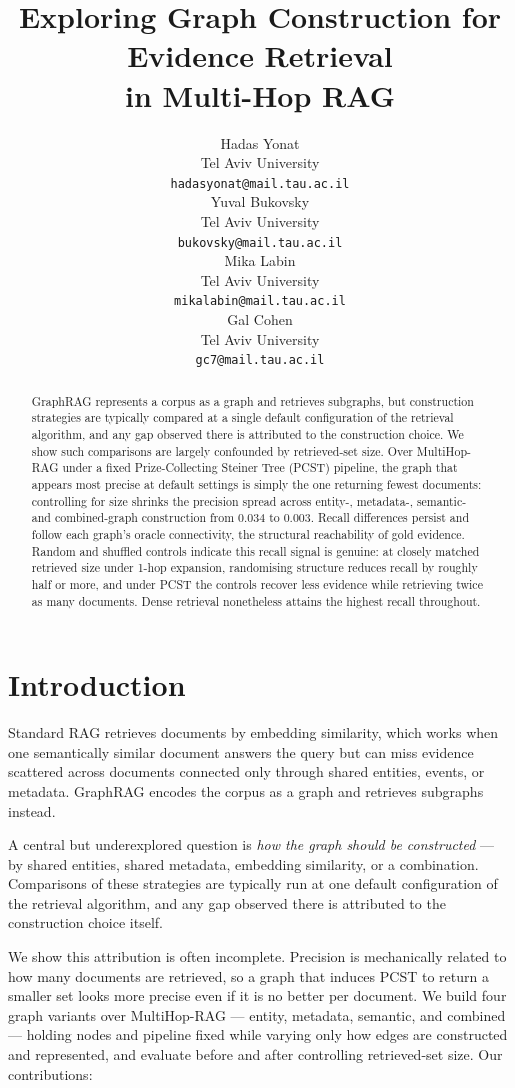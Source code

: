 \documentclass[11pt]{article}
\title{Exploring Graph Construction for Evidence Retrieval\\in Multi-Hop RAG}
\author{
  Hadas Yonat \\
  Tel Aviv University \\
  \texttt{hadasyonat@mail.tau.ac.il} \\\And
  Yuval Bukovsky \\
  Tel Aviv University \\
  \texttt{bukovsky@mail.tau.ac.il} \\\AND
  Mika Labin \\
  Tel Aviv University \\
  \texttt{mikalabin@mail.tau.ac.il} \\\And
  Gal Cohen \\
  Tel Aviv University \\
  \texttt{gc7@mail.tau.ac.il}
}
\begin{document}
\maketitle

\begin{abstract}
GraphRAG represents a corpus as a graph and retrieves subgraphs, but construction strategies are typically compared at a single default configuration of the retrieval algorithm, and any gap observed there is attributed to the construction choice. We show such comparisons are largely confounded by retrieved-set size. Over MultiHop-RAG under a fixed Prize-Collecting Steiner Tree (PCST) pipeline, the graph that appears most precise at default settings is simply the one returning fewest documents: controlling for size shrinks the precision spread across entity-, metadata-, semantic- and combined-graph construction from 0.034 to 0.003. Recall differences persist and follow each graph's oracle connectivity, the structural reachability of gold evidence. Random and shuffled controls indicate this recall signal is genuine: at closely matched retrieved size under 1-hop expansion, randomising structure reduces recall by roughly half or more, and under PCST the controls recover less evidence while retrieving twice as many documents. Dense retrieval nonetheless attains the highest recall throughout.
\end{abstract}

\section{Introduction}

Standard RAG retrieves documents by embedding similarity, which works when one semantically similar document answers the query but can miss evidence scattered across documents connected only through shared entities, events, or metadata. GraphRAG \citep{edge2024graphrag,peng2025graphragsurvey} encodes the corpus as a graph and retrieves subgraphs instead.

A central but underexplored question is \textit{how the graph should be constructed} --- by shared entities, shared metadata, embedding similarity, or a combination. Comparisons of these strategies are typically run at one default configuration of the retrieval algorithm, and any gap observed there is attributed to the construction choice itself.

We show this attribution is often incomplete. Precision is mechanically related to how many documents are retrieved, so a graph that induces PCST to return a smaller set looks more precise even if it is no better per document. We build four graph variants over MultiHop-RAG \citep{tang2024multihoprag} --- entity, metadata, semantic, and combined --- holding nodes and pipeline fixed while varying only how edges are constructed and represented, and evaluate before and after controlling retrieved-set size. Our contributions:
\end{document}
